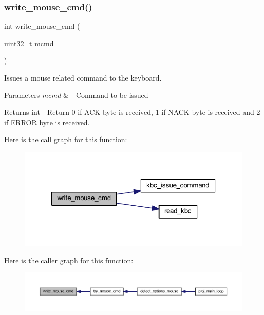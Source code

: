 \subsubsection{\texorpdfstring{write\+\_\+mouse\+\_\+cmd()}{write\_mouse\_cmd()}}
{\footnotesize\ttfamily int write\+\_\+mouse\+\_\+cmd (\begin{DoxyParamCaption}\item[{uint32\+\_\+t}]{mcmd }\end{DoxyParamCaption})}



Issues a mouse related command to the keyboard. 


\begin{DoxyParams}{Parameters}
{\em mcmd} & -\/ Command to be issued \\
\hline
\end{DoxyParams}
\begin{DoxyReturn}{Returns}
int -\/ Return 0 if A\+CK byte is received, 1 if N\+A\+CK byte is received and 2 if E\+R\+R\+OR byte is received. 
\end{DoxyReturn}
Here is the call graph for this function\+:
\nopagebreak
\begin{figure}[H]
\begin{center}
\leavevmode
\includegraphics[width=320pt]{group__mouse_ga992ee1b8a073ba102ee34e483b25c380_cgraph}
\end{center}
\end{figure}
Here is the caller graph for this function\+:
\nopagebreak
\begin{figure}[H]
\begin{center}
\leavevmode
\includegraphics[width=350pt]{group__mouse_ga992ee1b8a073ba102ee34e483b25c380_icgraph}
\end{center}
\end{figure}
